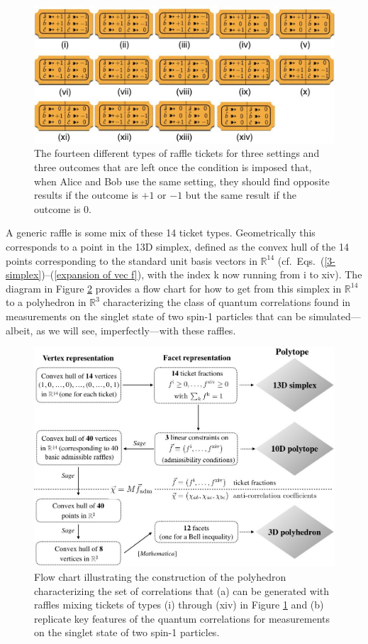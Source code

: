 \begin{figure}[h!]
 \centering
   \includegraphics[width=6in]{raffle-tickets-3set3out-i-xiv.jpeg} 
   \caption{The fourteen different types of raffle tickets for three settings and three outcomes that are left once the condition is imposed that, when Alice and Bob use the same setting, they should find opposite results if the outcome is $+1$ or $-1$ but the same result if the outcome is $0$.}
   \label{raffle-tickets-3set3out-i-xiv}
\end{figure}

A generic raffle is some mix of these 14 ticket types. Geometrically this corresponds to a point in the 13D simplex, defined as the convex hull of the 14 points corresponding to the standard unit basis vectors in $\mathbb{R}^{14}$ (cf.\ Eqs.\ (\ref{3-simplex})--(\ref{expansion of vec f}), with the index k now running from i to xiv). The diagram in Figure \ref{flowchart} provides a flow chart for how to get from this simplex in $\mathbb{R}^{14}$ to a polyhedron in $\mathbb{R}^3$ characterizing the class of quantum correlations found in measurements on the singlet state of two spin-1 particles that can be simulated---albeit, as we will see, imperfectly---with these raffles. 

\begin{figure}[h]
 \centering
   \includegraphics[width=5.5in]{flowchart.jpeg} 
   \caption{Flow chart illustrating the construction of the polyhedron characterizing the set of correlations that (a) can be generated with raffles mixing tickets of types (i) through (xiv) in Figure \ref{raffle-tickets-3set3out-i-xiv} and (b) replicate key features of the quantum correlations for measurements on the singlet state of two spin-1 particles.}
   \label{flowchart}
   \end{figure}

